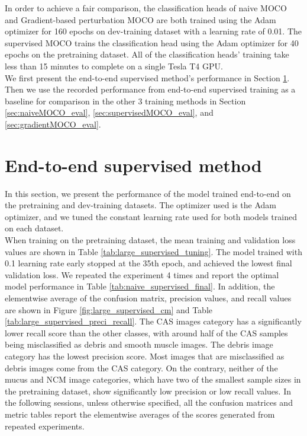 \documentclass[12pt,twoside]{report}
\begin{document}
In order to achieve a fair comparison, the classification heads of naive MOCO and Gradient-based perturbation MOCO are both trained using the Adam optimizer for 160 epochs on dev-training dataset with a learning rate of 0.01. The supervised MOCO trains the classification head using the Adam optimizer for 40 epochs on the pretraining dataset. All of the classification heads' training take less than 15 minutes to complete on a single Tesla T4 GPU. \\

We first present the end-to-end supervised method's performance in Section \ref{sec:end2end}. Then we use the recorded performance from end-to-end supervised training as a baseline for comparison in the other 3 training methods in Section \ref{sec:naiveMOCO_eval}, \ref{sec:supervisedMOCO_eval}, and \ref{sec:gradientMOCO_eval}. 

\section{End-to-end supervised method} \label{sec:end2end}
In this section, we present the performance of the model trained end-to-end on the pretraining and dev-training datasets. The optimizer used is the Adam optimizer, and we tuned the constant learning rate used for both models trained on each dataset. \\

When training on the pretraining dataset, the mean training and validation loss values are shown in Table \ref{tab:large_supervised_tuning}. The model trained with 0.1 learning rate early stopped at the 35th epoch, and achieved the lowest final validation loss. We repeated the experiment 4 times and report the optimal model performance in Table \ref{tab:naive_supervised_final}. In addition, the elementwise average of the confusion matrix, precision values, and recall values are shown in Figure \ref{fig:large_supervised_cm} and Table \ref{tab:large_supervised_preci_recall}. The CAS images category has a significantly lower recall score than the other classes, with around half of the CAS samples being misclassified as debris and smooth muscle images. The debris image category has the lowest precision score. Most images that are misclassified as debris images come from the CAS category. On the contrary, neither of the mucus and NCM image categories, which have two of the smallest sample sizes in the pretraining dataset, show significantly low precision or low recall values. In the following sessions, unless otherwise specified, all the confusion matrices and metric tables report the elementwise averages of the scores generated from repeated experiments.\\
\end{document}
